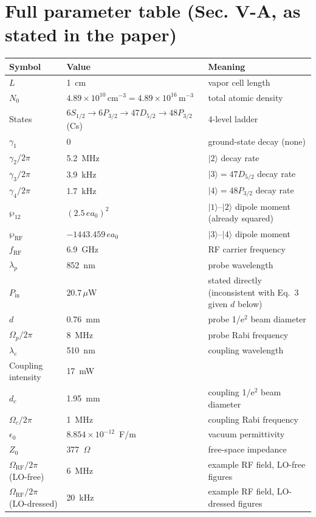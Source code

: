 \documentclass[11pt]{article}
\begin{document}
\section{Full parameter table (Sec. V-A, as stated in the paper)}
\begin{center}
\begin{tabular}{@{}lll@{}}
\toprule
Symbol & Value & Meaning\\
\midrule
$L$ & 1~cm & vapor cell length\\
$N_0$ & $4.89\times10^{10}\,\text{cm}^{-3}=4.89\times10^{16}\,\text{m}^{-3}$ & total atomic density\\
States & $6S_{1/2}\to6P_{3/2}\to47D_{5/2}\to48P_{3/2}$ (Cs) & 4-level ladder\\
$\gamma_1$ & 0 & ground-state decay (none)\\
$\gamma_2/2\pi$ & 5.2~MHz & $|2\rangle$ decay rate\\
$\gamma_3/2\pi$ & 3.9~kHz & $|3\rangle=47D_{5/2}$ decay rate\\
$\gamma_4/2\pi$ & 1.7~kHz & $|4\rangle=48P_{3/2}$ decay rate\\
$\wp_{12}$ & $(2.5\,e a_0)^2$ & $|1\rangle$--$|2\rangle$ dipole moment (already squared)\\
$\wp_\text{RF}$ & $-1443.459\,ea_0$ & $|3\rangle$--$|4\rangle$ dipole moment\\
$f_\text{RF}$ & 6.9~GHz & RF carrier frequency\\
$\lambda_p$ & 852~nm & probe wavelength\\
$P_\text{in}$ & $20.7\,\mu$W & stated directly (inconsistent with Eq.~3 given $d$ below)\\
$d$ & 0.76~mm & probe 1/e$^2$ beam diameter\\
$\Omega_p/2\pi$ & 8~MHz & probe Rabi frequency\\
$\lambda_c$ & 510~nm & coupling wavelength\\
Coupling intensity & 17~mW & \\
$d_c$ & 1.95~mm & coupling 1/e$^2$ beam diameter\\
$\Omega_c/2\pi$ & 1~MHz & coupling Rabi frequency\\
$\epsilon_0$ & $8.854\times10^{-12}$~F/m & vacuum permittivity\\
$Z_0$ & 377~$\Omega$ & free-space impedance\\
$\Omega_\text{RF}/2\pi$ (LO-free) & 6~MHz & example RF field, LO-free figures\\
$\Omega_\text{RF}/2\pi$ (LO-dressed) & 20~kHz & example RF field, LO-dressed figures\\

\end{tabular}
\end{center}
\end{document}
